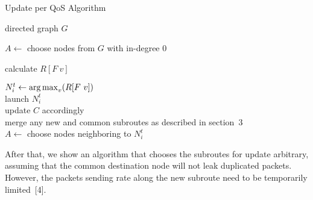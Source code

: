 \begin{multicols}{2}
\begin{algorithm*} %
 \setlength{\algowidth}{100mm}
 \setlength{\hsize}{\algowidth}
 \caption{Update per QoS Algorithm}
 \label{alg:update_per_qos}



 \small
 
 {directed graph $G$} 
 
 \BlankLine
  $A \leftarrow$ choose nodes from $G$ with in-degree $0$ \\
 
 {
 {
 calculate $R[F~v]$ \\
 }\label{alg:end_inner_loop}
 
 $N^t_i \leftarrow \mathop{\mathrm{arg}\,\mathrm{max}}_{v} (R[F~v])$ \label{alg:choose_qos} \\
 launch $N^t_i$ \\
 update $C$ accordingly \\
 merge any new and common subroutes as described in section~3 \\ 
 $A \leftarrow$ choose nodes neighboring to $N^t_i$ \\ 
 }
 
 \BlankLine 
 
\end{algorithm*}





 


After that, we show an algorithm that chooses the subroutes for update arbitrary, 
assuming that the common destination node will not leak duplicated packets. 
However, the packets sending rate along the new subroute need to be temporarily limited~[4].


\end{multicols}
